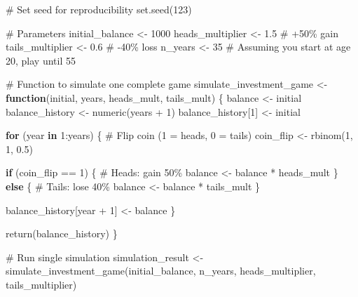 \documentclass[
  letterpaper,
  DIV=11,
  numbers=noendperiod]{scrartcl}
\newenvironment{Shaded}{\begin{snugshade}}{\end{snugshade}}
\newcommand{\CommentTok}[1]{\textcolor[rgb]{0.37,0.37,0.37}{#1}}
\newcommand{\ControlFlowTok}[1]{\textcolor[rgb]{0.00,0.23,0.31}{\textbf{#1}}}
\newcommand{\DecValTok}[1]{\textcolor[rgb]{0.68,0.00,0.00}{#1}}
\newcommand{\FloatTok}[1]{\textcolor[rgb]{0.68,0.00,0.00}{#1}}
\newcommand{\FunctionTok}[1]{\textcolor[rgb]{0.28,0.35,0.67}{#1}}
\newcommand{\NormalTok}[1]{\textcolor[rgb]{0.00,0.23,0.31}{#1}}
\newcommand{\OtherTok}[1]{\textcolor[rgb]{0.00,0.23,0.31}{#1}}
\newcommand{\SpecialCharTok}[1]{\textcolor[rgb]{0.37,0.37,0.37}{#1}}
\begin{document}
\begin{Shaded}
\begin{Highlighting}[]
\CommentTok{\# Set seed for reproducibility}
\FunctionTok{set.seed}\NormalTok{(}\DecValTok{123}\NormalTok{)}

\CommentTok{\# Parameters}
\NormalTok{initial\_balance }\OtherTok{\textless{}{-}} \DecValTok{1000}
\NormalTok{heads\_multiplier }\OtherTok{\textless{}{-}} \FloatTok{1.5}  \CommentTok{\# +50\% gain}
\NormalTok{tails\_multiplier }\OtherTok{\textless{}{-}} \FloatTok{0.6}  \CommentTok{\# {-}40\% loss}
\NormalTok{n\_years }\OtherTok{\textless{}{-}} \DecValTok{35}  \CommentTok{\# Assuming you start at age 20, play until 55}

\CommentTok{\# Function to simulate one complete game}
\NormalTok{simulate\_investment\_game }\OtherTok{\textless{}{-}} \ControlFlowTok{function}\NormalTok{(initial, years, heads\_mult, tails\_mult) \{}
\NormalTok{  balance }\OtherTok{\textless{}{-}}\NormalTok{ initial}
\NormalTok{  balance\_history }\OtherTok{\textless{}{-}} \FunctionTok{numeric}\NormalTok{(years }\SpecialCharTok{+} \DecValTok{1}\NormalTok{)}
\NormalTok{  balance\_history[}\DecValTok{1}\NormalTok{] }\OtherTok{\textless{}{-}}\NormalTok{ initial}
  
  \ControlFlowTok{for}\NormalTok{ (year }\ControlFlowTok{in} \DecValTok{1}\SpecialCharTok{:}\NormalTok{years) \{}
    \CommentTok{\# Flip coin (1 = heads, 0 = tails)}
\NormalTok{    coin\_flip }\OtherTok{\textless{}{-}} \FunctionTok{rbinom}\NormalTok{(}\DecValTok{1}\NormalTok{, }\DecValTok{1}\NormalTok{, }\FloatTok{0.5}\NormalTok{)}
    
    \ControlFlowTok{if}\NormalTok{ (coin\_flip }\SpecialCharTok{==} \DecValTok{1}\NormalTok{) \{}
      \CommentTok{\# Heads: gain 50\%}
\NormalTok{      balance }\OtherTok{\textless{}{-}}\NormalTok{ balance }\SpecialCharTok{*}\NormalTok{ heads\_mult}
\NormalTok{    \} }\ControlFlowTok{else}\NormalTok{ \{}
      \CommentTok{\# Tails: lose 40\%}
\NormalTok{      balance }\OtherTok{\textless{}{-}}\NormalTok{ balance }\SpecialCharTok{*}\NormalTok{ tails\_mult}
\NormalTok{    \}}
    
\NormalTok{    balance\_history[year }\SpecialCharTok{+} \DecValTok{1}\NormalTok{] }\OtherTok{\textless{}{-}}\NormalTok{ balance}
\NormalTok{  \}}
  
  \FunctionTok{return}\NormalTok{(balance\_history)}
\NormalTok{\}}

\CommentTok{\# Run single simulation}
\NormalTok{simulation\_result }\OtherTok{\textless{}{-}} \FunctionTok{simulate\_investment\_game}\NormalTok{(initial\_balance, n\_years, heads\_multiplier, tails\_multiplier)}


\end{Highlighting}
\end{Shaded}
\end{document}
